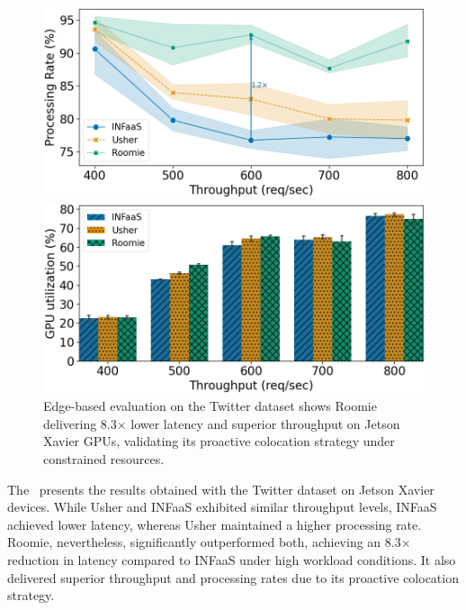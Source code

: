 \begin{figure}
\begin{minipage}[t]{.24\textwidth}
		\centering
		\includegraphics[width=\linewidth]{chapters/roomie/images/JetsonNano/twitter-all-models/normalized_line.png}
	\end{minipage}
	\hfill
	\begin{minipage}[t]{.24\textwidth}
		\centering
		\includegraphics[width=\textwidth]{chapters/roomie/images/JetsonNano/twitter-all-models/gpu_utilization.png}
	\end{minipage}
	\caption{Edge-based evaluation on the Twitter dataset shows Roomie delivering 8.3× lower latency and superior throughput on Jetson Xavier GPUs, validating its proactive colocation strategy under constrained resources.}
	\label{fig:JetsonNano/twitter-all-models}
	\vspace{-3mm}
\end{figure}

The~ presents the results obtained with the Twitter dataset on Jetson Xavier devices. While Usher and INFaaS exhibited similar throughput levels, INFaaS achieved lower latency, whereas Usher maintained a higher processing rate. Roomie, nevertheless, significantly outperformed both, achieving an 8.3× reduction in latency compared to INFaaS under high workload conditions. It also delivered superior throughput and processing rates due to its proactive colocation strategy.

